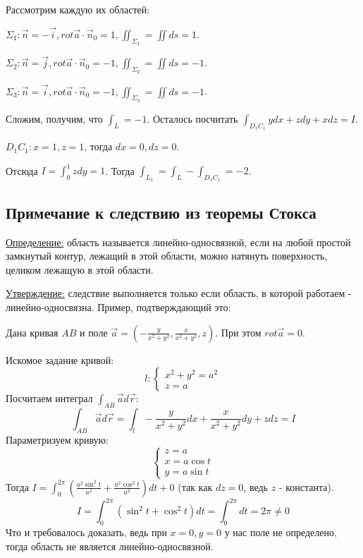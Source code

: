 \documentclass[12pt]{article}
\begin{document}
Рассмотрим каждую их областей:\par
$\Sigma_1 : \overrightarrow{n} = -\overrightarrow{i}, rot \overrightarrow{a} \cdot \overrightarrow{n}_0 = 1, \iint_{\Sigma_1} = \iint ds = 1$.\par
$\Sigma_2 : \overrightarrow{n} = \overrightarrow{j}, rot \overrightarrow{a} \cdot \overrightarrow{n}_0 = -1, \iint_{\Sigma_2} = \iint ds = -1$.\par
$\Sigma_3 : \overrightarrow{n} = \overrightarrow{i}, rot \overrightarrow{a} \cdot \overrightarrow{n}_0 = -1, \iint_{\Sigma_3} = \iint ds = -1$.\par
Сложим, получим, что $\int_L = -1$. Осталось посчитать $\int_{D_1C_1} ydx + zdy + xdz = I$.\par
$D_1C_1 : x = 1, z = 1$, тогда $dx = 0, dz = 0$.\par
Отсюда $I = \int_0^1 zdy = 1$. Тогда $\int_{L_1} = \int_L - \int_{D_1C_1} = -2$.\par
\subsection{Примечание к следствию из теоремы Стокса}
\uline{Определение:} область называется линейно-односвязной, если на любой простой замкнутый контур, лежащий в этой области, можно натянуть поверхность, целиком лежащую в этой области.\par
\uline{Утверждение:} следствие выполняется только если область, в которой работаем - линейно-односвязна.
Пример, подтверждающий это:\par
Дана кривая $AB$ и поле $\overrightarrow{a} = (-\frac{y}{x^2 + y^2}, \frac{x}{x^2 + y^2}, z)$. При этом $rot \overrightarrow{a} = 0$.\par
Искомое задание кривой:
$$l :\begin{cases} x^2 + y^2 = a^2 \\ z = a \end{cases}$$
Посчитаем интеграл $\int_{AB} \overrightarrow{a} d \overrightarrow{r}$:
$$\int_{AB} \overrightarrow{a} d \overrightarrow{r} = \int_l -\frac{y}{x^2 + y^2} dx + \frac{x}{x^2 + y^2} dy + zdz = I$$
Параметризуем кривую:
$$\begin{cases} z = a \\ x = a \cos t \\ y = a \sin t \end{cases}$$
Тогда $I = \int_0^{2 \pi} (\frac{a^2 \sin^2 t}{a^2} + \frac{a^2 \cos^2 t}{a^2}) dt + 0$ (так как $dz = 0$, ведь $z$ - константа).
$$I = \int_0^{2 \pi} (\sin^2 t + \cos^2 t) dt = \int_0^{2 \pi} dt = 2 \pi \neq 0$$
Что и требовалось доказать, ведь при $x = 0, y = 0$ у нас поле не определено, тогда область не является линейно-односвязной.\par
\end{document}

